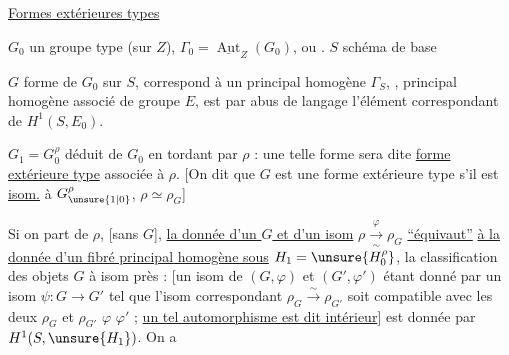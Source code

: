 \uline{Formes extérieures types}


$G_0$ un groupe  type (sur $Z$), $\Gamma_0=\underline{\operatorname{Aut}}_Z(G_0)$,  ou .
$S$ schéma de base

$G$ forme de $G_0$ sur $S$, correspond à un principal homogène  $\Gamma_S$, 
, principal homogène associé de groupe $E$,  est  par abus de langage l'élément correspondant de $H^1(S,E_0)$.

$G_1=G_0^\rho$ déduit de $G_0$ en tordant par $\rho$  : une telle  forme sera dite \uline{forme extérieure type} associée à $\rho$.
[On dit que $G$ est une forme extérieure type s'il est \uline{isom.} à $G_{\unsure{1|0}}^\rho$,   $\rho\simeq\rho_G$]

Si on part de $\rho$, [sans $G$], \uline{la donnée d'un $G$ et d'un isom} $\rho\xrightarrow[\sim]{\varphi}\rho_G$ \uline{``équivaut''} \uline{à la donnée d'un fibré principal homogène sous} $H_1=\unsure{H_0^\rho}$, la classification des objets $G$ à isom près :
[un isom de $(G,\varphi)$ et $(G',\varphi')$ étant donné par un isom $\psi:G\longrightarrow G'$ tel que l'isom correspondant $\rho_G\xrightarrow{\sim}\rho_{G'}$ soit compatible avec les deux $\rho_G$ et $\rho_{G'}$  $\varphi$ $\varphi'$ ; \uline{un tel automorphisme est dit intérieur}]   est donnée par $H^1(S,\unsure{H_1})$. On a


